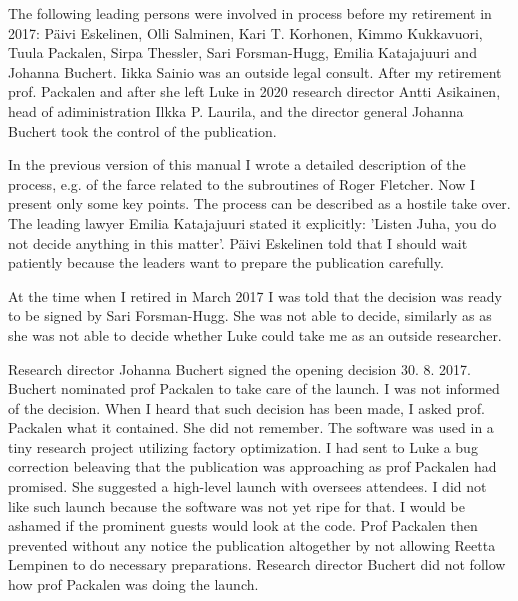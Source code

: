 The following leading persons were involved in
process before my retirement in 2017: P\"aivi Eskelinen, Olli Salminen, Kari T. Korhonen,
Kimmo Kukkavuori,
Tuula Packalen, Sirpa Thessler, Sari Forsman-Hugg, Emilia Katajajuuri and Johanna
Buchert. Iikka Sainio was an outside legal consult.
After my retirement prof. Packalen and after she left Luke in 2020
research director Antti Asikainen, head of adiministration Ilkka P. Laurila,
and  the director general Johanna Buchert
took the control of the publication.

In the previous version of this manual I wrote a detailed description of the process, e.g.
of the farce related
to the subroutines of Roger Fletcher. Now I present only some key points.
The process can be described as a hostile take over.
The leading lawyer Emilia Katajajuuri stated it
explicitly: 'Listen Juha, you do not decide anything in this matter'.
P\"aivi Eskelinen told that I should wait
patiently because the leaders want to prepare
the publication carefully.



At the time when I retired in March 2017 I was told that the decision was
ready to be signed by Sari Forsman-Hugg.
She was not able to decide, similarly as as she was not able to
decide whether Luke could take me as an outside researcher.


Research director Johanna Buchert signed the opening decision 30. 8. 2017.
Buchert nominated prof Packalen to take care of the launch.
I was not informed of the decision. When I heard that such decision has been made,
I asked prof. Packalen what it contained.
She did not remember. The software was used in a tiny research project utilizing factory optimization.
I had sent to Luke a bug correction beleaving  that the
publication was approaching as prof Packalen had promised. She suggested a
high-level launch with oversees attendees. I did not like such
launch because
the software was not yet ripe
for that. I would be ashamed if the prominent guests would look at the code.
Prof Packalen then prevented without any notice the publication altogether by not allowing
Reetta Lempinen to do necessary preparations.
Research director Buchert did not follow how prof Packalen was doing
the launch.

